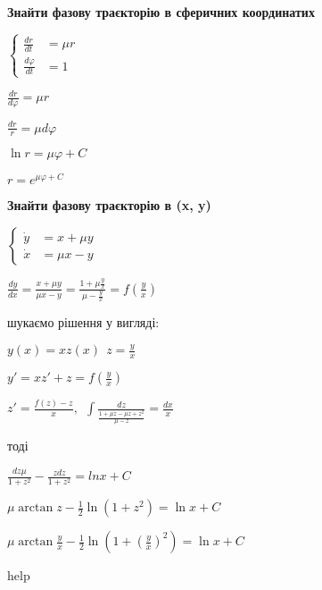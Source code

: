 \textbf{Знайти фазову траєкторію в сферичних координатих }

$\left\{\begin{aligned}
    \frac{dr}{dt} &= \mu r\\
    \frac{d\varphi}{dt} &= 1
\end{aligned}\right.$

$\frac{dr}{d\varphi} = \mu r$

$\frac{dr}{r} = \mu d\varphi$

$\ln r = \mu \varphi + C$

$r = e ^{\mu\varphi + C}$

\textbf{Знайти фазову траєкторію в (x, y) }

$\left\{\begin{aligned}
    \dot{y} &= x + \mu y \\
    \dot{x} &= \mu x - y
\end{aligned}\right.$

$\frac{dy}{dx} = \frac{x+\mu y}{\mu x-y} = \frac{1 + \mu\frac{y}{x}}{\mu - \frac{y}{x}} = f(\frac{y}{x})$

шукаємо рішення у вигляді:

$y(x) = xz(x) \ \ z = \frac{y}{x}$

$y' = xz' + z = f(\frac{y}{x})$

$z' = \frac{f(z) - z}{x}, \ \ \int \frac{dz}{\frac{1 + \mu z - \mu z + z^2}{\mu - z}} =  \frac{dx}{x}$

тоді 

$\frac{dz\mu}{1+z^2} - \frac{zdz}{1+z^2} = lnx + C$

$\mu \arctan z - \frac{1}{2}\ln (1+z^2) = \ln x + C$

$\mu \arctan\frac{y}{x} - \frac{1}{2}\ln(1+(\frac{y}{x})^2) = \ln x +C $

\begin{flushright}
    help
\end{flushright}